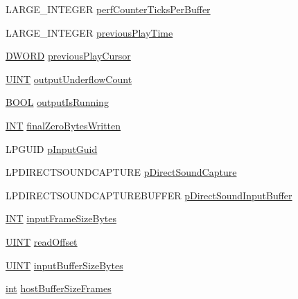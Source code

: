 \begin{DoxyCompactItemize}
\item 
L\+A\+R\+G\+E\+\_\+\+I\+N\+T\+E\+G\+ER \hyperlink{struct_pa_win_ds_stream_a039793c3d1d95db8711f1ae64a73ed9b}{perf\+Counter\+Ticks\+Per\+Buffer}
\item 
L\+A\+R\+G\+E\+\_\+\+I\+N\+T\+E\+G\+ER \hyperlink{struct_pa_win_ds_stream_acb8b10d5f65fe09ff39316b62c9da6aa}{previous\+Play\+Time}
\item 
\hyperlink{mapinls_8h_ad342ac907eb044443153a22f964bf0af}{D\+W\+O\+RD} \hyperlink{struct_pa_win_ds_stream_a89734a0c1089e6451603807450366035}{previous\+Play\+Cursor}
\item 
\hyperlink{mapinls_8h_a36cb3b01d81ffd844bbbfb54003e06ec}{U\+I\+NT} \hyperlink{struct_pa_win_ds_stream_a6caeecd8ba926e6afa3b66575dab748a}{output\+Underflow\+Count}
\item 
\hyperlink{nfilterkit_8h_a3be13892ae7076009afcf121347dd319}{B\+O\+OL} \hyperlink{struct_pa_win_ds_stream_a23d5ebcba24ed4cc170f141d8f03ff48}{output\+Is\+Running}
\item 
\hyperlink{vr32_8c_a77387b8d37d173f242ab062e4f4c0cac}{I\+NT} \hyperlink{struct_pa_win_ds_stream_acd51ef94d9e64347740607961f5a81a3}{final\+Zero\+Bytes\+Written}
\item 
L\+P\+G\+U\+ID \hyperlink{struct_pa_win_ds_stream_a3a2980bf6763f6bd46068a95a9ccf5d0}{p\+Input\+Guid}
\item 
L\+P\+D\+I\+R\+E\+C\+T\+S\+O\+U\+N\+D\+C\+A\+P\+T\+U\+RE \hyperlink{struct_pa_win_ds_stream_a41406bbfae2cf1c5a4673ecbded9c0ff}{p\+Direct\+Sound\+Capture}
\item 
L\+P\+D\+I\+R\+E\+C\+T\+S\+O\+U\+N\+D\+C\+A\+P\+T\+U\+R\+E\+B\+U\+F\+F\+ER \hyperlink{struct_pa_win_ds_stream_ae18cfa662e81841c320c0ce4a4c3bbca}{p\+Direct\+Sound\+Input\+Buffer}
\item 
\hyperlink{vr32_8c_a77387b8d37d173f242ab062e4f4c0cac}{I\+NT} \hyperlink{struct_pa_win_ds_stream_ac661215f5343548244a321f52cd44daf}{input\+Frame\+Size\+Bytes}
\item 
\hyperlink{mapinls_8h_a36cb3b01d81ffd844bbbfb54003e06ec}{U\+I\+NT} \hyperlink{struct_pa_win_ds_stream_a0079b8e85936fe109614a93943944cf0}{read\+Offset}
\item 
\hyperlink{mapinls_8h_a36cb3b01d81ffd844bbbfb54003e06ec}{U\+I\+NT} \hyperlink{struct_pa_win_ds_stream_a3fbd62cc367d1f364da681b4614ee2e2}{input\+Buffer\+Size\+Bytes}
\item 
\hyperlink{xmltok_8h_a5a0d4a5641ce434f1d23533f2b2e6653}{int} \hyperlink{struct_pa_win_ds_stream_aac98f9ae09a1f1b4038e4e127b4f638f}{host\+Buffer\+Size\+Frames}

\end{DoxyCompactItemize}
